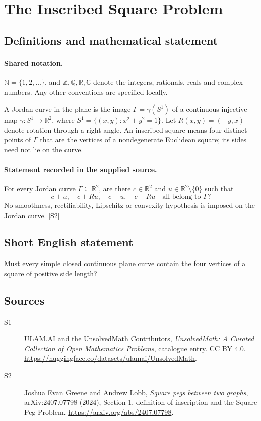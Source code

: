 \documentclass[11pt]{article}
\newcommand{\sref}[2]{\hyperlink{source:#1:#2}{[S#2]}}
\begin{document}
\section{The Inscribed Square Problem}\label{statement}

\subsection{Definitions and mathematical statement}

\paragraph{Shared notation.}$\mathbb N=\{1,2,\ldots\}$, and $\mathbb Z,\mathbb Q,\mathbb R,\mathbb C$ denote the integers, rationals, reals and complex numbers. Any other conventions are specified locally.


A Jordan curve in the plane is the image \(\Gamma=\gamma(S^1)\)
of a continuous injective map \(\gamma:S^1\to\mathbb R^2\), where
\(S^1=\{(x,y):x^2+y^2=1\}\).
Let \(R(x,y)=(-y,x)\) denote rotation through a right angle.
An inscribed square means four distinct points of \(\Gamma\) that
are the vertices of a nondegenerate Euclidean square; its sides
need not lie on the curve.
\paragraph{Statement recorded in the supplied source.}
For every Jordan curve \(\Gamma\subseteq\mathbb R^2\), are there
\(c\in\mathbb R^2\) and \(u\in\mathbb R^2\setminus\{0\}\) such that
\[
 c+u,\quad c+Ru,\quad c-u,\quad c-Ru
       \quad\text{all belong to }\Gamma?
\]
No smoothness, rectifiability, Lipschitz or convexity hypothesis
is imposed on the Jordan curve. \sref{statement}{2}
\subsection{Short English statement}
Must every simple closed continuous plane curve contain the four vertices of a square of positive side length?
\subsection{Sources}
\begin{description}
\item[\hypertarget{source:statement:1}{S1}] ULAM.AI and the UnsolvedMath Contributors, \emph{UnsolvedMath: A Curated Collection of Open Mathematics Problems}, catalogue entry. CC BY 4.0. \url{https://huggingface.co/datasets/ulamai/UnsolvedMath}.
\item[\hypertarget{source:statement:2}{S2}] Joshua Evan Greene and Andrew Lobb, \emph{Square pegs between two graphs}, arXiv:2407.07798 (2024), Section 1, definition of inscription and the Square Peg Problem. \url{https://arxiv.org/abs/2407.07798}.
\end{description}
\label{end:statement}
\end{document}
